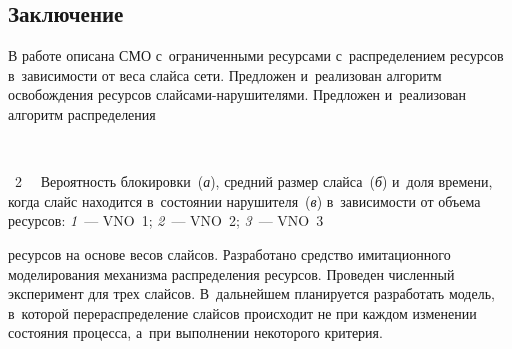 \begin{multicols}{2}
  
  \section{Заключение}
  
  \vspace*{-2pt}
  
  В работе описана СМО с~ограниченными 
ресурсами с~распределением ресурсов в~зависимости от
веса слайса сети. 
Предложен и~реализован алгоритм освобождения ресурсов  
слай\-са\-ми-на\-ру\-ши\-те\-ля\-ми. Предложен и~реализован алгоритм 
распределения\linebreak\vspace*{-12pt}

{ \begin{center}  %
 \vspace*{-3pt}
   \mbox{%
 \epsfxsize=79.374mm 
 }

\end{center}

\noindent
{{\figurename~2}\ \ \small{
Вероятность блокировки~(\textit{а}),  
средний размер слайса~(\textit{б}) 
и~доля времени, когда слайс находится в~состоянии нарушителя~(\textit{в})
в~зависимости от объема ресурсов: \textit{1}~--- VNO~1; 
\textit{2}~--- VNO~2; \textit{3}~--- VNO~3
}}}

\vspace*{12pt}





\noindent
 ресурсов на основе весов слайсов. Разработано средство 
имитационного моделирования механизма распределения ресурсов. Проведен 
численный эксперимент для трех слайсов. В~дальнейшем планируется 
разработать модель, в~которой перераспределение слайсов происходит не при 
каждом изменении состояния процесса, а~при выполнении некоторого 
критерия.

\vspace*{-8pt}
  
{\small\frenchspacing
 {%
 \begin{thebibliography}{9}
 
 \vspace*{-1pt}
 

\end{thebibliography}}}
\end{multicols}
